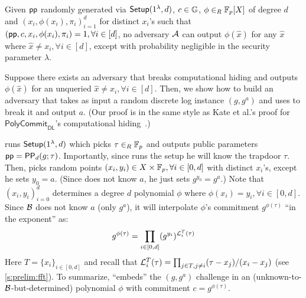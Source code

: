 \begin{definition}
\label{d:polycommit:comp-hiding}
Given $\mathsf{pp}$ randomly generated via $\mathsf{Setup}(1^\lambda, d)$, $c\in \mathbb{G}$, $\phi \in_R \mathbb{F}_p[X]$ of degree $d$ and $(x_i, \phi(x_i), \pi_i)_{i=1}^d$ for distinct $x_i$'s such that \polyverifyeval$(\mathsf{pp}, c, x_i, \phi(x_i), \pi_i) = 1, \forall i\in[d]$, no adversary $\mathcal{A}$ can output $\phi(\hat{x})$ for any $\hat{x}$ where $\hat{x} \ne x_i, \forall i\in[d]$, except with probability negligible in the security parameter $\lambda$.
\end{definition}


Suppose there exists an adversary \Adv that breaks computational hiding and outputs $\phi(\hat{x})$ for an unqueried $\hat{x}\ne x_i, \forall i\in[d]$.
Then, we show how to build an adversary \AdvB that takes as input a random discrete log instance $(g, g^a)$ and uses \Adv to break it and output $a$.
(Our proof is in the same style as Kate et al.'s proof for $\mathsf{PolyCommit}_\mathsf{DL}$'s computational hiding~\cite{KZG10b}.)

\AdvB runs $\mathsf{Setup}(1^\lambda, d)$ which picks $\tau\in_R \mathbb{F}_p$ and outputs public parameters $\mathsf{pp}=\mathsf{PP}_d(g;\tau)$.
Importantly, since \AdvB runs the setup he will know the trapdoor $\tau$.
Then, \AdvB picks random points $(x_i, y_i) \in X\times \mathbb{F}_p, \forall i\in[0,d]$ with distinct $x_i$'s, except he sets $y_0 = a$.
(Since \AdvB does not know $a$, he just sets $g^{y_0}=g^a$.)
Note that $(x_i, y_i)_{i=0}^d$ determines a degree $d$ polynomial $\phi$ where $\phi(x_i) = y_i,\forall i\in[0,d]$.
Since $\mathcal{B}$ does not know $a$ (only $g^a$), it will interpolate $\phi$'s commitment $g^{\phi(\tau)}$ ``in the exponent'' as:
$$g^{\phi(\tau)} = \prod_{i\in [0,d]} (g^{y_i})^{\mathcal{L}_i^{T}(\tau)}$$
Here $T=\{x_i\}_{i\in [0,d]}$ and recall that $\mathcal{L}_i^T(\tau)=\prod_{j\in T, j\ne i} (\tau-x_j)/(x_i-x_j)$ (see \cref{s:prelim:fft}).
To summarize, \AdvB ``embeds'' the $(g,g^a)$ challenge in an (unknown-to-$\mathcal{B}$-but-determined) polynomial $\phi$ with commitment $c=g^{\phi(\tau)}$.

